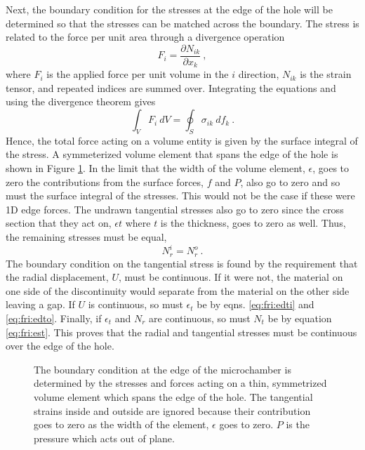 Next, the boundary condition for the stresses at the edge of the hole will be determined so that the stresses can be matched across the boundary.
The stress is related to the force per unit area through a divergence operation
\begin{equation}
	F_i=\frac{\partial N_{ik}}{\partial x_k} \ ,
\end{equation}
where $F_i$ is the applied force per unit volume in the $i$ direction, $N_{ik}$ is the strain tensor, and repeated indices are summed over.
Integrating the equations and using the divergence theorem gives
\begin{equation}
	\int_V F_i \ dV=\oint_S \sigma_{ik} \ df_k \ .
\end{equation}
Hence, the total force acting on a volume entity is given by the surface integral of the stress.
A symmeterized volume element that spans the edge of the hole is shown in Figure \ref{fig:fri:egestress}.
In the limit that the width of the volume element, $\epsilon$, goes to zero the contributions from the surface forces, $f$ and $P$, also go to zero and so must the surface integral of the stresses.
This would not be the case if these were 1D edge forces.
The undrawn tangential stresses also go to zero since the cross section that they act on, $\epsilon t$ where $t$ is the thickness, goes to zero as well. 
Thus, the remaining stresses must be equal,
\begin{equation}
	N_r^i=N_r^o \ .
\end{equation}
The boundary condition on the tangential stress is found by the requirement that the radial displacement, $U$, must be continuous.
If it were not, the material on one side of the discontinuity would separate from the material on the other side leaving a gap.
If $U$ is continuous, so must $\epsilon_t$ be by eqns. \ref{eq:fri:edti} and \ref{eq:fri:edto}.
Finally, if $\epsilon_t$ and $N_r$ are continuous, so must $N_t$ be by equation \ref{eq:fri:est}.
This proves that the radial and tangential stresses must be continuous over the edge of the hole.

\begin{figure}
	\begin{center}
	
	\end{center}
	\caption[The boundary condition at the edge of the microchamber]{\label{fig:fri:egestress}The boundary condition at the edge of the microchamber is determined by the stresses and forces acting on a thin, symmetrized volume element which spans the edge of the hole.  The tangential strains inside and outside are ignored because their contribution goes to zero as the width of the element, $\epsilon$ goes to zero.  $P$ is the pressure which acts out of plane.}
\end{figure}

